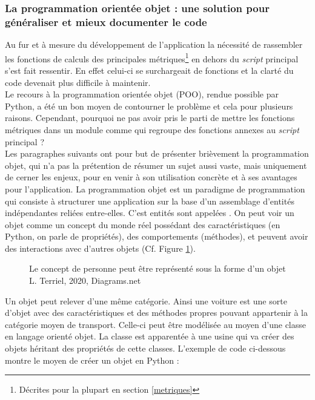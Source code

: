 \subsubsection{La programmation orientée objet : une solution pour généraliser et mieux documenter le code}
Au fur et à mesure du développement de l'application la nécessité de rassembler les fonctions de calculs des principales métriques\footnote{Décrites pour la plupart en section \ref{metriques}} en dehors du \textit{script} principal  s'est fait ressentir. En effet celui-ci se surchargeait de fonctions et la clarté du code devenait plus difficile à maintenir.\\ 

Le recours à la programmation orientée objet (POO), rendue possible par Python, a été un bon moyen de contourner le problème et cela pour plusieurs raisons. Cependant, pourquoi ne pas avoir pris le parti de mettre les fonctions métriques dans un module comme  qui regroupe des fonctions annexes au \textit{script} principal ?\\ 

Les paragraphes suivants ont pour but de présenter brièvement la programmation objet, qui n'a pas la prétention de résumer un sujet aussi vaste, mais uniquement de cerner les enjeux, pour en venir à son utilisation concrète et à ses avantages pour l'application.
\newpage
La programmation objet est un paradigme de programmation qui consiste à structurer une application sur la base d'un assemblage d'entités indépendantes reliées entre-elles. C'est entités sont appelées . On peut voir un objet comme un concept du monde réel possédant des caractéristiques (en Python, on parle de propriétés), des comportements (méthodes), et peuvent avoir des interactions avec d'autres objets (Cf. Figure \ref{fig:concept_POO}). 
\begin{figure}[H]
    \centering
    \centerline{}
    \caption{Le concept de personne peut être représenté sous la forme d'un objet \textcopyright L. Terriel, 2020, Diagrams.net}
    \label{fig:concept_POO}
\end{figure}
\newpage
Un objet peut relever d'une même catégorie. Ainsi une voiture est une sorte d'objet avec des caractéristiques et des méthodes propres pouvant appartenir à la catégorie moyen de transport. Celle-ci peut être modélisée au moyen d'une classe en langage orienté objet. La classe est apparentée à une usine qui va créer des objets héritant des propriétés de cette classes. L'exemple de code ci-dessous montre le moyen de créer un objet  en Python :

